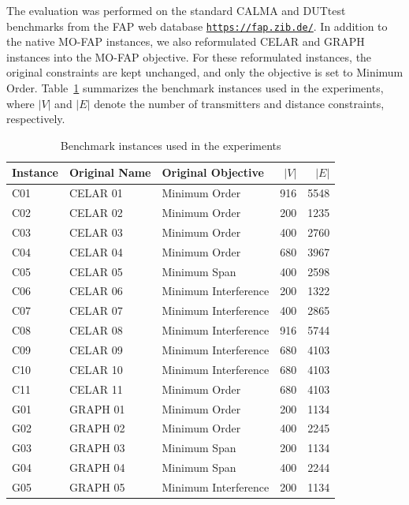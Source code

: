 \documentclass[letterpaper,journal]{IEEEtran}
\begin{document}
The evaluation was performed on the standard CALMA and DUTtest benchmarks from the FAP web database \texttt{\url{https://fap.zib.de/}}. In addition to the native MO-FAP instances, we also reformulated CELAR and GRAPH instances into the MO-FAP objective. For these reformulated instances, the original constraints are kept unchanged, and only the objective is set to Minimum Order. Table~\ref{tab:benchmark_instances} summarizes the benchmark instances used in the experiments, where $|V|$ and $|E|$ denote the number of transmitters and distance constraints, respectively.
\begin{table}[!htbp]
\centering
\caption{Benchmark instances used in the experiments}
\label{tab:benchmark_instances}
\scriptsize
\setlength{\tabcolsep}{3pt}
\renewcommand{\arraystretch}{1.0}
\begin{tabular}{@{}llp{}rr@{}}
\toprule
\textbf{Instance} & \textbf{Original Name} & \textbf{Original Objective} & $|V|$ & $|E|$ \\
\midrule
C01 & CELAR 01 & Minimum Order & 916 & 5548 \\
C02 & CELAR 02 & Minimum Order & 200 & 1235 \\
C03 & CELAR 03 & Minimum Order & 400 & 2760 \\
C04 & CELAR 04 & Minimum Order & 680 & 3967 \\
C05 & CELAR 05 & Minimum Span & 400 & 2598 \\
C06 & CELAR 06 & Minimum Interference & 200 & 1322 \\
C07 & CELAR 07 & Minimum Interference & 400 & 2865 \\
C08 & CELAR 08 & Minimum Interference & 916 & 5744 \\
C09 & CELAR 09 & Minimum Interference & 680 & 4103 \\
C10 & CELAR 10 & Minimum Interference & 680 & 4103 \\
C11 & CELAR 11 & Minimum Order & 680 & 4103 \\
G01 & GRAPH 01 & Minimum Order & 200 & 1134 \\
G02 & GRAPH 02 & Minimum Order & 400 & 2245 \\
G03 & GRAPH 03 & Minimum Span & 200 & 1134 \\
G04 & GRAPH 04 & Minimum Span & 400 & 2244 \\
G05 & GRAPH 05 & Minimum Interference & 200 & 1134 \\

\end{tabular}
\end{table}
\end{document}
